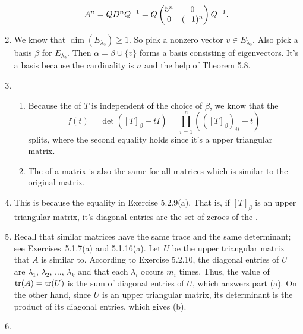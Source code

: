 \begin{enumerate}
\[A^n=QD^nQ^{-1}=Q\begin{pmatrix}5^n & 0\cr 0 & (-1)^n\end{pmatrix}Q^{-1}.\]
\item We know that $\dim(E_{\lambda_2})\geq 1$. So pick a nonzero vector $v\in E_{\lambda_2}$. Also pick a basis $\beta $ for $E_{\lambda_2}$. Then $\alpha=\beta\cup \{v\}$ forms a basis consisting of eigenvectors. It's a basis because the cardinality is $n$ and the help of Theorem 5.8.
\item \begin{enumerate}
\item Because the \charpoly{} of $T$ is independent of the choice of $\beta $, we know that the \charpoly{} 
\[f(t)=\det([T]_{\beta}-tI)=\prod_{i=1}^n{(([T]_{\beta})_{ii}-t)}\]
splits, where the second equality holds since it's a upper triangular matrix.
\item The \charpoly{} of a matrix is also the same for all matrices which is similar to the original matrix.
\end{enumerate}
\item This is because the equality in Exercise 5.2.9(a). That is, if $[T]_{\beta }$ is an upper triangular matrix, it's diagonal entries are the set of zeroes of the \charpoly{}.
\item Recall that similar matrices have the same trace and the same determinant; see Exercises~5.1.7(a) and 5.1.16(a).  Let $U$ be the upper triangular matrix that $A$ is similar to.  According to Exercise 5.2.10, the diagonal entries of $U$ are $\lambda_1$, $\lambda_2$, $\ldots$, $\lambda_k$ and that each $\lambda_i$ occurs $m_i$ times.  Thus, the value of $\operatorname{tr}(A) = \operatorname{tr}(U)$ is the sum of diagonal entries of $U$, which answers part (a).  On the other hand, since $U$ is an upper triangular matrix, its determinant is the product of its diagonal entries, which gives (b).
\item \begin{enumerate}

\end{enumerate}
\end{enumerate}
